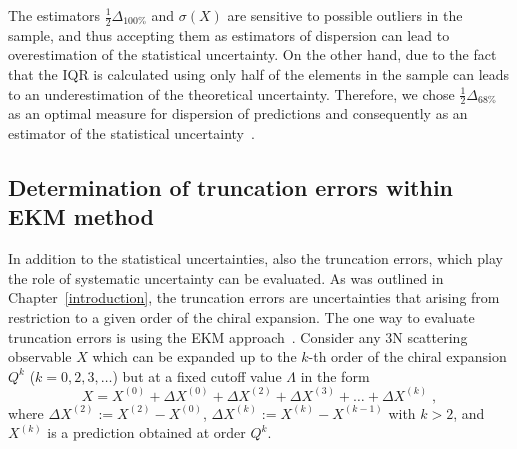 The estimators $\frac{1}{2}\Delta_{100\%}$ and $\sigma(X)$ are sensitive to possible outliers in the sample, and thus accepting them as estimators of dispersion can lead to overestimation of the statistical uncertainty. On the other hand, due to the fact that the IQR is calculated using only half of the elements in the sample can leads to an underestimation of the theoretical uncertainty. Therefore, we chose $\frac{1}{2}\Delta_{68\%}$ as an optimal measure for dispersion of predictions and consequently as an estimator of the statistical uncertainty~\cite{Skibinski2018}. 

\subsection{Determination of truncation errors within EKM method}
\label{truncation}
In addition to the statistical uncertainties, also the truncation errors, which play the role of systematic uncertainty can be evaluated. As was outlined in Chapter~\ref{introduction}, the truncation errors are uncertainties that arising from restriction to a given order of the chiral expansion. The one way to evaluate truncation errors is using the EKM approach~\cite{Epelbaum2015}. 
Consider any 3N scattering observable $X$ which can be expanded up to the $k$-th order of the chiral expansion $Q^{k}$ ($k = 0, 2, 3, \ldots$) but at a fixed cutoff value $\Lambda$ in the form
\begin{equation}
X = X^{(0)} + \Delta X^{(0)} + \Delta X^{(2)} + \Delta X^{(3)} + \ldots + \Delta X^{(k)}\;,
\label{eq:trunc1}
\end{equation}
where $\Delta X^{(2)} := X^{(2)} - X^{(0)}$, $\Delta X^{(k)} := X^{(k)} - X^{(k-1)}$ with $k > 2$, and $X^{(k)}$ is a prediction obtained at order $Q^{k}$.

